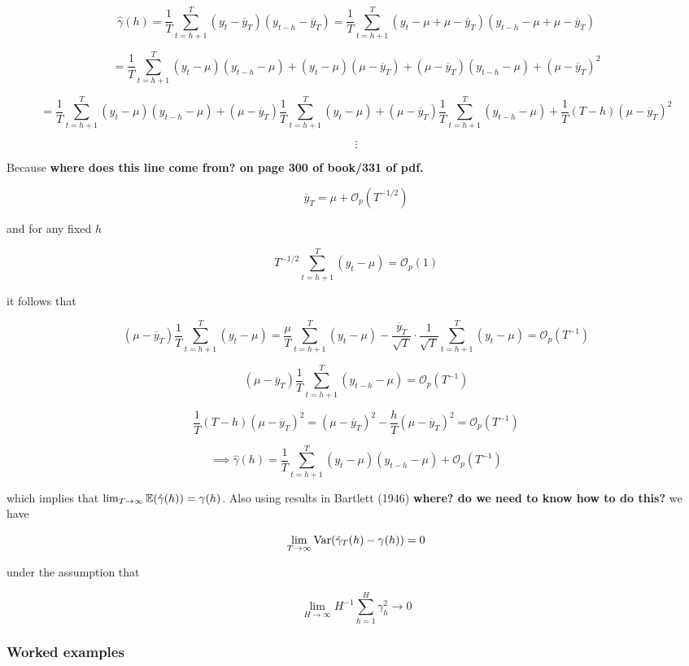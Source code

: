 \[
\hat{\gamma}(h) = \frac{1}{T} \sum_{t=h+1}^T(y_t - \overline{y}_T)(y_{t-h} - \overline{y}_T) = \frac{1}{T} \sum_{t=h+1}^T(y_t - \mu + \mu - \overline{y}_T)(y_{t-h} - \mu + \mu -  \overline{y}_T)
\]

\[
= \frac{1}{T} \sum_{t=h+1}^T(y_t - \mu)(y_{t-h} - \mu) + (y_t - \mu)(\mu -  \overline{y}_T) + (\mu - \overline{y}_T)(y_{t-h} - \mu) + (\mu - \overline{y}_T)^2
\]

\[
= \frac{1}{T} \sum_{t=h+1}^T(y_t - \mu)(y_{t-h} - \mu) + (\mu -  \overline{y}_T)  \frac{1}{T} \sum_{t=h+1}^T (y_t - \mu)+ (\mu - \overline{y}_T) \frac{1}{T} \sum_{t=h+1}^T(y_{t-h} - \mu) + \frac{1}{T}(T - h)(\mu - \overline{y}_T)^2
\]



\[
\vdots
\]

Because \textbf{where does this line come from? on page 300 of book/331 of pdf.}

\[
\overline{y}_T = \mu + \mathcal{O}_p(T^{-1/2})
\]

and for any fixed \(h\)

\[
T^{-1/2} \sum_{t=h+1}^T (y_t - \mu) = \mathcal{O}_p(1)
\]

it follows that 

\[
 (\mu -  \overline{y}_T)  \frac{1}{T} \sum_{t=h+1}^T (y_t - \mu) =  \frac{\mu}{T} \sum_{t=h+1}^T (y_t - \mu) -  \frac{\overline{y}_T}{\sqrt{T}} \cdot \frac{1}{\sqrt{T}} \sum_{t=h+1}^T (y_t - \mu) =\mathcal{O}_p(T^{-1})
\]

\[
 (\mu - \overline{y}_T) \frac{1}{T} \sum_{t=h+1}^T(y_{t-h} - \mu)  =\mathcal{O}_p(T^{-1})
\]

\[
\frac{1}{T}(T - h)(\mu - \overline{y}_T)^2 = (\mu - \overline{y}_T)^2 - \frac{h}{T}(\mu - \overline{y}_T)^2 = \mathcal{O}_p(T^{-1})
\]

\[
\implies \hat{\gamma}(h)  = \frac{1}{T} \sum_{t=h+1}^T(y_t - \mu)(y_{t-h} - \mu) + \mathcal{O}_p(T^{-1}) 
\]

which implies that \(\lim_{T \to \infty} \mathbb{E}(\hat{\gamma}(h)) = \gamma(h)\). Also using results in Bartlett (1946) \textbf{where? do we need to know how to do this?} we have

\[
\lim_{T \to \infty} \mathrm{Var}(\hat{\gamma}_T(h) - \gamma(h)) = 0
\]

under the assumption that 

\[
\lim_{H \to \infty} H^{-1} \sum_{h=1}^H \gamma_h^2 \to 0
\]


\subsubsection{Worked examples}

